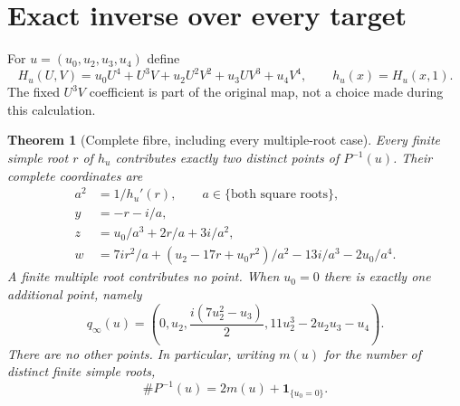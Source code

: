 \documentclass[11pt]{article}
\newtheorem{theorem}{Theorem}
\begin{document}
\section{Exact inverse over every target}
For $u=(u_0,u_2,u_3,u_4)$ define
\begin{equation}
 H_u(U,V)=u_0U^4+U^3V+u_2U^2V^2+u_3UV^3+u_4V^4,
 \qquad h_u(x)=H_u(x,1).\tag{GF6}
\end{equation}
The fixed $U^3V$ coefficient is part of the original map, not a
choice made during this calculation.

\begin{theorem}[Complete fibre, including every multiple-root case]
Every finite simple root $r$ of $h_u$ contributes exactly two
distinct points of $P^{-1}(u)$. Their complete coordinates are
\begin{align}
 a^2&=1/h_u'(r),\qquad a\in\{\text{both square roots}\},\nonumber\\
 y&=-r-i/a,\nonumber\\
 z&=u_0/a^3+2r/a+3i/a^2,\nonumber\\
 w&=7ir^2/a+(u_2-17r+u_0r^2)/a^2-13i/a^3-2u_0/a^4.
 \tag{GF7}
\end{align}
A finite multiple root contributes no point. When $u_0=0$ there
is exactly one additional point, namely
\begin{equation}
 q_\infty(u)=
 \left(0,u_2,\frac{i(7u_2^2-u_3)}2,
                  11u_2^3-2u_2u_3-u_4\right).\tag{GF8}
\end{equation}
There are no other points. In particular, writing $m(u)$ for the
number of distinct finite simple roots,
\begin{equation}
 \#P^{-1}(u)=2m(u)+\mathbf1_{\{u_0=0\}}.\tag{GF9}
\end{equation}
\end{theorem}
\end{document}
